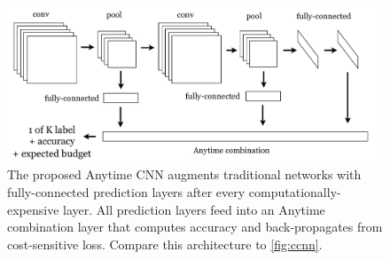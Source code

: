 \begin{figure}[h!]
\begin{center}
\includegraphics[width=0.98\columnwidth]{../ccnn/figures/ccnn-expanded-anytime.pdf}
\caption[Architecture of the proposed Anytime CNN.]{
The proposed Anytime CNN augments traditional networks with fully-connected prediction layers after every computationally-expensive layer.
All prediction layers feed into an Anytime combination layer that computes accuracy and back-propagates from cost-sensitive loss.
Compare this architecture to \autoref{fig:ccnn}.
}\label{fig:ccnn_anytime}
\end{center}
\end{figure}
